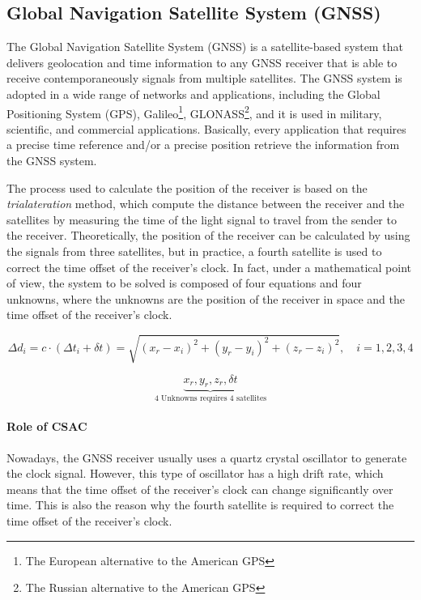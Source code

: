 \subsection{Global Navigation Satellite System (GNSS)}
\label{subsec:GNSS}

The Global Navigation Satellite System (GNSS) is a satellite-based system that delivers geolocation and time information to any GNSS receiver that is able to receive contemporaneously signals from multiple satellites.
The GNSS system is adopted in a wide range of networks and applications, including the Global Positioning System (GPS), Galileo\footnote{The European alternative to the American GPS}, GLONASS\footnote{The Russian alternative to the American GPS}, and it is used in military, scientific, and commercial applications.
Basically, every application that requires a precise time reference and/or a precise position retrieve the information from the GNSS system.

The process used to calculate the position of the receiver is based on the \textit{trialateration} method, which compute the distance between the receiver and the satellites by measuring the time of the light signal to travel from the sender to the receiver.
Theoretically, the position of the receiver can be calculated by using the signals from three satellites, but in practice, a fourth satellite is used to correct the time offset of the receiver's clock.
In fact, under a mathematical point of view, the system to be solved is composed of four equations and four unknowns, where the unknowns are the position of the receiver in space and the time offset of the receiver's clock.

\begin{equation}
    \Delta d_i = c \cdot (\Delta t_i + \delta t) = \sqrt{(x_r - x_i)^2 + (y_r - y_i)^2 + (z_r - z_i)^2}, \quad i = 1, 2, 3, 4
\end{equation}

\begin{equation}
    \underbrace{x_r, y_r, z_r, \delta t}_\text{4 Unknowns requires 4 satellites}
\end{equation}


\paragraph{Role of CSAC}

Nowadays, the GNSS receiver usually uses a quartz crystal oscillator to generate the clock signal.
However, this type of oscillator has a high drift rate, which means that the time offset of the receiver's clock can change significantly over time.
This is also the reason why the fourth satellite is required to correct the time offset of the receiver's clock.

